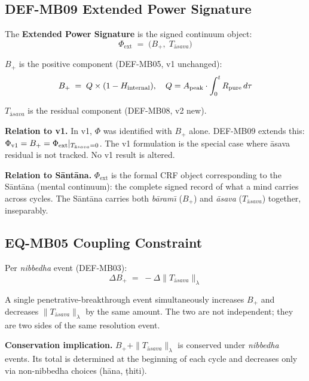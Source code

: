 \documentclass[12pt, a4paper]{article}
\providecommand{\Phiext}{\Phi_{\mathrm{ext}}}
\providecommand{\Bplus}{B_{+}}
\providecommand{\Tasava}{T_{\bar{\mathrm{a}}sava}}
\providecommand{\Tasava}{\mathcal{T}_{\!\mathrm{\bar{a}sava}}}
\begin{document}
\subsection{DEF-MB09 \quad Extended Power Signature}


\begin{formalbox}[title={DEF-MB09: Extended Power Signature
  $\Phiext$ (NEW v2)}]
The \textbf{Extended Power Signature} is the signed
continuum object:
\[
  \Phiext \;=\; \bigl(\Bplus,\;\Tasava\bigr)
\]

$\Bplus$ is the positive component (DEF-MB05, v1 unchanged):
\[
  \Bplus \;=\; Q \times (1 - H_{\rm internal}),
  \quad Q = A_{\rm peak}\cdot\int_0^t R_{\rm pure}\,d\tau
\]

$\Tasava$ is the residual component (DEF-MB08, v2 new).

\textbf{Relation to v1.}
In v1, $\Phi$ was identified with $\Bplus$ alone.
DEF-MB09 extends this: $\Phi_{\rm v1} = \Bplus =
\Phiext|_{\Tasava = 0}$. The v1 formulation is the
special case where \={a}sava residual is not tracked.
No v1 result is altered.

\textbf{Relation to S\={a}nt\={a}na.}
$\Phiext$ is the formal CRF object corresponding to
the S\={a}nt\={a}na (mental continuum): the complete
signed record of what a mind carries across cycles.
The S\={a}nt\={a}na carries both \textit{b\={a}ram\={\i}}
($\Bplus$) and \textit{\={a}sava} ($\Tasava$) together,
inseparably.
\end{formalbox}

\subsection{EQ-MB05 \quad Coupling Constraint}


\begin{formalbox}[title={EQ-MB05: Coupling Constraint
  (NEW v2)}]
Per \textit{nibbedha} event (DEF-MB03):
\[
  \Delta\Bplus \;=\; -\Delta\|\Tasava\|_\lambda
\]

A single penetrative-breakthrough event simultaneously
increases $\Bplus$ and decreases $\|\Tasava\|_\lambda$
by the same amount. The two are not independent; they
are two sides of the same resolution event.

\textbf{Conservation implication.}
$\Bplus + \|\Tasava\|_\lambda$ is conserved under
\textit{nibbedha} events. Its total is determined at
the beginning of each cycle and decreases only via
non-nibbedha choices (h\={a}na, \d{t}hiti).
\end{formalbox}
\end{document}

